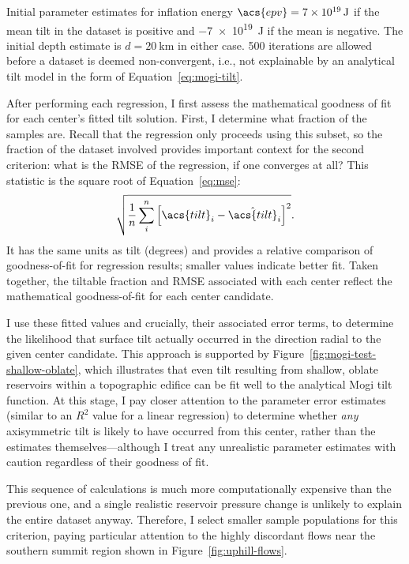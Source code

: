 Initial parameter estimates for inflation energy $\acs{epv} = \qty{7e19}{\J}$ if the mean tilt in the dataset is positive and \qty{-7e19}{\J} if the mean is negative. The initial depth estimate is $d = \qty{20}{\km}$ in either case. 500 iterations are allowed before a dataset is deemed non-convergent, i.e., not explainable by an analytical tilt model in the form of Equation~\eqref{eq:mogi-tilt}.

After performing each regression, I first assess the mathematical goodness of fit for each center's fitted tilt solution. First, I determine what fraction of the samples are. Recall that the regression only proceeds using this subset, so the fraction of the dataset involved provides important context for the second criterion: what is the \ac{RMSE} of the regression, if one converges at all? This statistic is the square root of Equation~\eqref{eq:mse}:
\begin{equation}
    \sqrt{\frac{1}{n}\sum_{i}^{n}{\left[\acs{tilt}_i-\hat{\acs{tilt}}_i\right]}^2}.\label{eq:rmse}
\end{equation}
It has the same units as \acs{tilt} (degrees) and provides a relative comparison of goodness-of-fit for regression results; smaller values indicate better fit. Taken together, the tiltable fraction and \ac{RMSE} associated with each center reflect the mathematical goodness-of-fit for each center candidate.

I use these fitted values and crucially, their associated error terms, to determine the likelihood that surface tilt actually occurred in the direction radial to the given center candidate. This approach is supported by Figure~\ref{fig:mogi-test-shallow-oblate}, which illustrates that even tilt resulting from shallow, oblate reservoirs within a topographic edifice can be fit well to the analytical Mogi tilt function. At this stage, I pay closer attention to the parameter error estimates (similar to an $R^2$ value for a linear regression) to determine whether \emph{any} axisymmetric tilt is likely to have occurred from this center, rather than the estimates themselves---although I treat any unrealistic parameter estimates with caution regardless of their goodness of fit.

This sequence of calculations is much more computationally expensive than the previous one, and a single realistic reservoir pressure change is unlikely to explain the entire dataset anyway. Therefore, I select smaller sample populations for this criterion, paying particular attention to the highly discordant flows near the southern summit region shown in Figure~\ref{fig:uphill-flows}.

